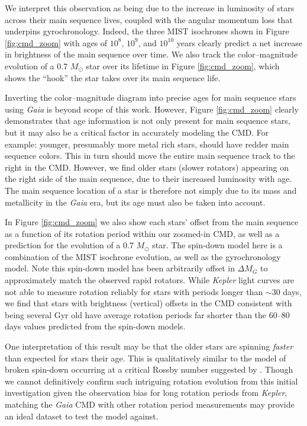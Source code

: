 \documentclass[preprint2]{aastex62}
\newcommand{\Kepler}{\textsl{Kepler}\xspace}
\begin{document}
We interpret this observation as being due to the increase in luminosity of stars across their main sequence lives, coupled with the angular momentum loss that underpins gyrochronology. Indeed, the three MIST isochrones shown in Figure \ref{fig:cmd_zoom} with ages of $10^8$, $10^9$, and $10^{10}$ years clearly predict a net increase in brightness of the main sequence over time. We also track the color--magnitude evolution of a 0.7 $M_\odot$ star over its lifetime in Figure \ref{fig:cmd_zoom}, which shows the ``hook'' the star takes over its main sequence life. 

Inverting the color--magnitude diagram into precise ages for main sequence stars using {\em Gaia} is beyond scope of this work. However, Figure \ref{fig:cmd_zoom} clearly demonstrates that age information is not only present for main sequence stars, but it may also be a critical factor in accurately modeling the CMD. For example: younger, presumably more metal rich stars, should have redder main sequence colors. This in turn should move the entire main sequence track to the right in the CMD. However, we find older stars (slower rotators) appearing on the right side of the main sequence, due to their increased luminosity with age. The main sequence location of a star is therefore not simply due to its mass and metallicity in the {\em Gaia} era, but its age must also be taken into account.

In Figure \ref{fig:cmd_zoom} we also show each stars' offset from the main sequence as a function of its rotation period within our zoomed-in CMD, as well as a prediction for the evolution of a 0.7 $M_\odot$ star. The spin-down model here is a combination of the MIST isochrone evolution, as well as the \citet{meibom2009} gyrochronology model. Note this spin-down model has been arbitrarily offset in $\Delta M_G$ to approximately match the observed rapid rotators. 
While \Kepler light curves are not able to measure rotation reliably for stars with periods longer than $\sim$30 days, we find that stars with brightness (vertical) offsets in the CMD consistent with being several Gyr old have average rotation periods far shorter than the 60--80 days values predicted from the spin-down models.

One interpretation of this result may be that the older stars are spinning {\it faster} than expected for stars their age. This is qualitatively similar to the model of broken spin-down occurring at a critical Rossby number suggested by \citet{van-saders2016}. Though we cannot definitively confirm such intriguing rotation evolution from this initial investigation given the observation bias for long rotation periods from \Kepler, matching the {\em Gaia} CMD with other rotation period measurements may provide an ideal dataset to test the \citet{van-saders2016} model against. 
\end{document}
